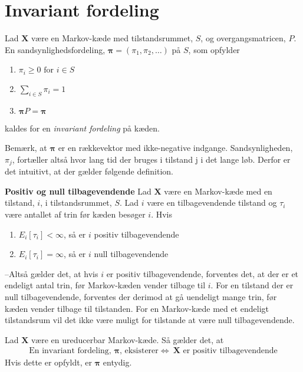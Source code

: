 \section{Invariant fordeling}

\begin{defn}\textbf{} %
\newline \label{defn: invariant_fordeling}
Lad $\bm X$ være en Markov-kæde med tilstandsrummet, $S$, og overgangsmatricen, $P$. En sandsynlighedsfordeling, $\bm\pi=(\pi_1,\pi_2,\dots)$ på $S$, som opfylder
\begin{enumerate}
    \item $\pi_i\geq 0 \text{ for } i\in S$
    \item $\displaystyle\sum_{i\in S} \pi_i=1$
    \item $\bm\pi P=\bm\pi$
\end{enumerate}
kaldes for en \textit{invariant fordeling} på kæden. 
\end{defn}
Bemærk, at $\bm\pi$ er en rækkevektor med ikke-negative indgange.
Sandsynligheden, $\pi_j$, fortæller altså hvor lang tid der bruges i tilstand j i det lange løb. Derfor er det intuitivt, at der gælder følgende definition.

\begin{defn}\textbf{Positiv og null tilbagevendende} %
\newline
Lad $\bm X$ være en Markov-kæde med en tilstand, $i$, i tilstandsrummet, $S$. Lad $i$ være en tilbagevendende tilstand og $\tau_i$ være antallet af trin før kæden besøger $i$. Hvis
\begin{enumerate}
    \item $E_i[\tau_i]<\infty$, så er $i$ positiv tilbagevendende
    \item $E_i[\tau_i]=\infty$, så er $i$ null tilbagevendende
\end{enumerate}
\end{defn}

--Altså gælder det, at hvis $i$ er positiv tilbagevendende, forventes det, at der er et endeligt antal trin, før Markov-kæden vender tilbage til $i$. For en tilstand der er null tilbagevendende, forventes der derimod at gå uendeligt mange trin, før kæden vender tilbage til tilstanden. For en Markov-kæde med et endeligt tilstandsrum vil det ikke være muligt for tilstande at være null tilbagevendende. 

\begin{minipage}\textwidth
\begin{thmx} \textbf{} %
\newline
Lad $\bm X$ være en ureducerbar Markov-kæde. Så gælder det, at 
\begin{align*}
    \text{En invariant fordeling, } \bm \pi \text{, eksisterer} \Leftrightarrow \ \bm X \text{ er positiv tilbagevendende}
\end{align*}
Hvis dette er opfyldt, er $\bm\pi$ entydig. 
\end{thmx}
\end{minipage}

